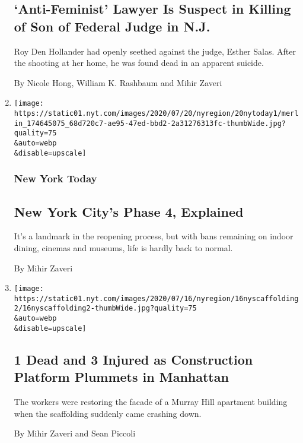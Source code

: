 \begin{enumerate}
  \hypertarget{anti-feminist-lawyer-is-suspect-in-killing-of-son-of-federal-judge-in-nj}{%
  \subsection{`Anti-Feminist' Lawyer Is Suspect in Killing of Son of
  Federal Judge in
  N.J.}\label{anti-feminist-lawyer-is-suspect-in-killing-of-son-of-federal-judge-in-nj}}

  Roy Den Hollander had openly seethed against the judge, Esther Salas.
  After the shooting at her home, he was found dead in an apparent
  suicide.

  By Nicole Hong, William K. Rashbaum and Mihir Zaveri
\item
  \href{/2020/07/20/nyregion/nyc-phase-4-reopening-coronavirus.html}{}

  \texttt{[image: https://static01.nyt.com/images/2020/07/20/nyregion/20nytoday1/merlin\_174645075\_68d720c7-ae95-47ed-bbd2-2a31276313fc-thumbWide.jpg?quality=75\\\&auto=webp\\\&disable=upscale]}

  \hypertarget{new-york-today-1}{%
  \subsubsection{New York Today}\label{new-york-today-1}}

  \hypertarget{new-york-citys-phase-4-explained}{%
  \subsection{New York City's Phase 4,
  Explained}\label{new-york-citys-phase-4-explained}}

  It's a landmark in the reopening process, but with bans remaining on
  indoor dining, cinemas and museums, life is hardly back to normal.

  By Mihir Zaveri
\item
  \href{/2020/07/16/nyregion/murray-hill-scaffolding-collapse.html}{}

  \texttt{[image: https://static01.nyt.com/images/2020/07/16/nyregion/16nyscaffolding2/16nyscaffolding2-thumbWide.jpg?quality=75\\\&auto=webp\\\&disable=upscale]}

  \hypertarget{1-dead-and-3-injured-as-construction-platform-plummets-in-manhattan}{%
  \subsection{1 Dead and 3 Injured as Construction Platform Plummets in
  Manhattan}\label{1-dead-and-3-injured-as-construction-platform-plummets-in-manhattan}}

  The workers were restoring the facade of a Murray Hill apartment
  building when the scaffolding suddenly came crashing down.

  By Mihir Zaveri and Sean Piccoli
\end{enumerate}

